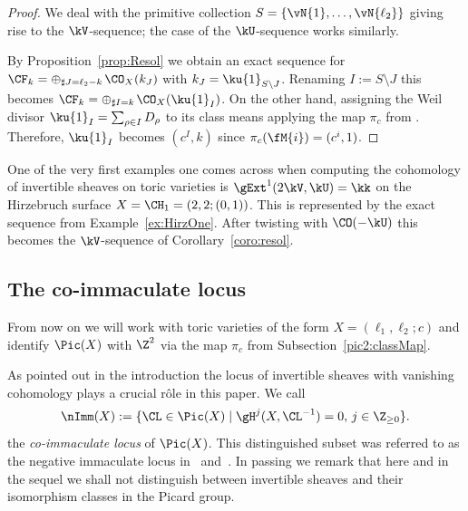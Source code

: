 \begin{proof}
We deal with the primitive collection 
$S=\{\vN{1}, \ldots,\vN{\ell_2}\}$
giving rise to the $\kV$-sequence; the
case of the $\kU$-sequence works similarly.

By Proposition~\ref{prop:Resol}
we obtain an exact sequence for 
$\CF_k=\oplus_{\sharp J=\ell_2-k\,}\CO_X(k_J)$ 
with $k_J=\ku{1}_{S\setminus J}$.
Renaming $I:=S\setminus J$ this becomes
$\CF_k=\oplus_{\sharp I=k\,}\CO_X(\ku{1}_I)$. 
On the other hand, assigning the Weil 
divisor $\ku{1}_I=\sum_{\rho\in I} D_\rho$ 
to its class means applying the map $\pi_c$ 
from . Therefore, 
$\ku{1}_I$ becomes $(c^I,k)$ since 
$\pi_c(\fM{i})=(c^i,1)$.
\end{proof}

\begin{exam}
\label{ex:resol}
One of the very first examples one comes
across when computing the cohomology of 
invertible sheaves on toric varieties is
$\gExt^1(2\kV,\kU)=\kk$ on the Hirzebruch
surface $X=\CH_1=(2,2;(0,1))$. This is 
represented by the exact sequence from 
Example~\ref{ex:HirzOne}. After twisting 
with $\CO(-\kU)$ this becomes the 
$\kV$-sequence of Corollary~\ref{coro:resol}.
\end{exam}

\subsection{{The co-immaculate locus}}
\label{subsec:ImmLoc}
From now on we will work with toric 
varieties of the form $X=(\ell_1,\ell_2;c)$ 
and identify $\Pic(X)$ with $\Z^2$ via 
the map $\pi_c$ from 
Subsection~\ref{pic2:classMap}. 

As pointed out in the introduction the 
locus of invertible sheaves with vanishing 
cohomology plays a crucial r\^ole in this 
paper. We call
$$
\nImm(X):=\{\CL\in\Pic(X)\mid
\gH^j(X,\CL^{-1})=0,\,j\in\Z_{\geq0}\}.
$$
the {{\em co-immaculate locus}} of $\Pic(X)$. 
This distinguished subset was referred to 
as the {negative} immaculate locus 
in~\cite{immaculate} and~\cite{p1p1p1}. 
In passing we remark that here and in the sequel we 
shall not distinguish between invertible 
sheaves and their isomorphism classes in 
the Picard group.

